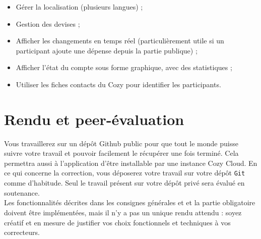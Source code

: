 \documentclass{42-fr}
\begin{document}
    \begin{itemize}\itemsep1pt
		\item G\'erer la localisation (plusieurs langues) ;
        \item Gestion des devises ;
		\item Afficher les changements en temps r\'eel (particuli\`erement utile si
			un participant ajoute une d\'epense depuis la partie publique) ;
		\item Afficher l'\'etat du compte sous forme graphique, avec des statistiques ;
		\item Utiliser les fiches contacts du Cozy pour identifier les participants.
    \end{itemize}




\chapter{Rendu et peer-\'evaluation}

	Vous travaillerez sur un d\'ep\^ot Github public pour que tout le monde puisse suivre
	votre travail et pouvoir facilement le r\'ecup\'erer une fois termin\'e. Cela permettra
	aussi \`a l'application d'\^etre installable par une instance Cozy Cloud.\newline
	En ce qui concerne la correction, vous d\'eposerez votre travail sur votre d\'ep\^ot
	\texttt{Git} comme d'habitude.\newline
	Seul le travail pr\'esent sur votre d\'ep\^ot priv\'e sera \'evalu\'e en soutenance.\\
	Les fonctionnalit\'es d\'ecrites dans les consignes g\'en\'erales et et la partie
	obligatoire doivent \^etre impl\'ement\'ees, mais il n'y a pas un unique rendu attendu :
	soyez cr\'eatif et en mesure de justifier vos choix fonctionnels et techniques \`a vos
	correcteurs.



\end{document}

